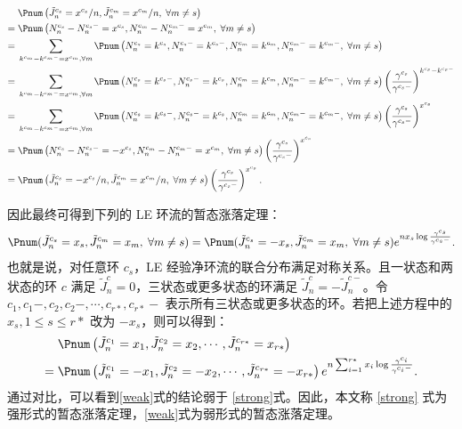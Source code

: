 \begin{align*}
&\; \Pnum\left(\tilde{J}^{c_s}_n=x^{c_s}/n,\tilde{J}^{c_m}_n=x^{c_m}/n,\;\forall m\neq s\right) \\
=&\; \Pnum\left(N^{c_s}_n-N^{c_s-}_n=x^{c_s},N^{c_m}_n-N^{c_m-}_n=x^{c_m},\;\forall m\neq s\right) \\
=&\; \sum_{k^{c_m}-k^{c_m-}=x^{c_m},\forall  m }\Pnum\left(N^{c_s}_n=k^{c_s},N^{c_s-}_n=k^{c_s-},  N^{c_m}_n=k^{c_m},N^{c_m-}_n=k^{c_m-},\;\forall m\neq s\right) \\
=&\; \sum_{k^{c_m}-k^{c_m-}=x^{c_m},\forall  m }\Pnum\left(N^{c_s}_n=k^{c_s-},N^{c_s-}_n=k^{c_s}, N^{c_m}_n=k^{c_m},N^{c_m-}_n=k^{c_m-},\;\forall m\neq s\right)\left(\frac{\gamma^{c_s}}{\gamma^{c_s-}}\right)^{k^{c_s}-k^{c_s-}}  \\
=&\; \sum_{k^{c_m}-k^{c_m-}=x^{c_m},\forall  m }\Pnum\left(N^{c_s}_n=k^{c_s-},N^{c_s-}_n=k^{c_s}, N^{c_m}_n=k^{c_m},N^{c_m-}_n=k^{c_m-},\;\forall m\neq s\right)\left(\frac{\gamma^{c_s}}{\gamma^{c_s-}}\right)^{x^{c_s}} \\
=&\; \Pnum\left(N^{c_s}_n-N^{c_s-}_n=-x^{c_s},N^{c_m}_n-N^{c_m-}_n=x^{c_m},\;\forall m\neq s\right)\left(\frac{\gamma^{c_s}}{\gamma^{c_s-}}\right)^{x^{c_s}} \\
=&\; \Pnum\left(\tilde{J}^{c_s}_n=-x^{c_s}/n,\tilde{J}^{c_m}_n=x^{c_m}/n,\;\forall m\neq s\right)\left(\frac{\gamma^{c_s}}{\gamma^{c_s-}}\right)^{x^{c_s}}.
\end{align*}

因此最终可得到下列的 LE 环流的暂态涨落定理：
\begin{equation}\label{strong}
\Pnum(\tilde{J}^{c_s}_n=x_s,\tilde{J}^{c_m}_n=x_m,\;\forall m\neq s) \\
= \Pnum(\tilde{J}^{c_s}_n=-x_s,\tilde{J}^{c_m}_n=x_m,\;\forall m\neq s)e^{nx_s\log\frac{\gamma^{c_s}}{\gamma^{c_s-}}}.
\end{equation}
也就是说，对任意环 $c_s$，LE 经验净环流的联合分布满足对称关系。且一状态和两状态的环 $c$ 满足 $\tilde{J}^c_n=0$，三状态或更多状态的环满足 $\tilde{J}^c_n=-\tilde{J}^{c-}_n$。令 $c_1,c_1-,c_2,c_2-,\cdots,c_{r*},c_{r*}-$ 
表示所有三状态或更多状态的环。若把上述方程中的 $x_s, 1\leq s\leq r*$ 改为 $-x_s$，则可以得到：
\begin{equation}\label{weak}
    \begin{split}
    &\;\Pnum\left(\tilde{J}^{c_1}_n=x_1,\tilde{J}^{c_2}_n=x_2,\cdots,\tilde{J}^{c_{r*}}_n=x_{r*}\right)\\
    =&\; \Pnum\left(\tilde{J}^{c_1}_n=-x_1,\tilde{J}^{c_2}_n=-x_2,\cdots,\tilde{J}^{c_{r*}}_n=-x_{r*}\right)
    e^{n\sum_{i=1}^{r*}x_i\log\frac{\gamma^{c_i}}{\gamma^{c_i-}}}.
    \end{split}
\end{equation}
通过对比，可以看到\eqref{weak}式的结论弱于 \eqref{strong}式。因此，本文称 \eqref{strong} 式为强形式的暂态涨落定理，\eqref{weak}式为弱形式的暂态涨落定理。

